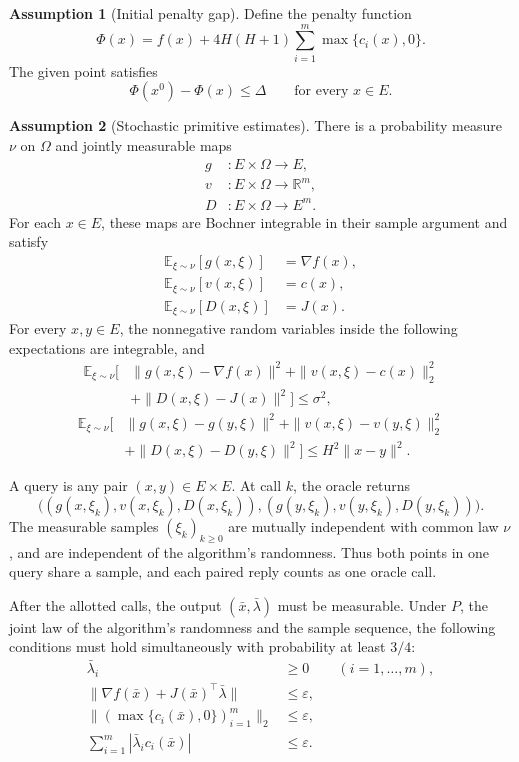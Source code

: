 \documentclass[10pt]{article}
\theoremstyle{definition}
\newtheorem{assumption}{Assumption}
\begin{document}
\begin{assumption}[Initial penalty gap]
Define the penalty function
\[
\Phi(x)=f(x)+4H(H+1)\sum_{i=1}^m\max\{c_i(x),0\}.
\]
The given point satisfies
\[
\Phi(x^0)-\Phi(x)\leq\Delta
\qquad\text{for every }x\in E.
\]
\end{assumption}

\begin{assumption}[Stochastic primitive estimates]
There is a probability measure $\nu$ on $\Omega$ and jointly measurable maps
\[
\begin{aligned}
g&:E\times\Omega\to E,\\
v&:E\times\Omega\to\mathbb{R}^m,\\
D&:E\times\Omega\to E^m.
\end{aligned}
\]
For each $x\in E$, these maps are Bochner integrable in their sample argument and satisfy
\[
\begin{aligned}
\mathbb{E}_{\xi\sim\nu}[g(x,\xi)]&=\nabla f(x),\\
\mathbb{E}_{\xi\sim\nu}[v(x,\xi)]&=c(x),\\
\mathbb{E}_{\xi\sim\nu}[D(x,\xi)]&=J(x).
\end{aligned}
\]
For every $x,y\in E$, the nonnegative random variables inside the following expectations are integrable, and
\[
\begin{aligned}
\mathbb{E}_{\xi\sim\nu}\bigl[
&\|g(x,\xi)-\nabla f(x)\|^2
+\|v(x,\xi)-c(x)\|_2^2\\
&+\|D(x,\xi)-J(x)\|^2\bigr]
\leq\sigma^2,
\end{aligned}
\]
\[
\begin{aligned}
\mathbb{E}_{\xi\sim\nu}\bigl[
&\|g(x,\xi)-g(y,\xi)\|^2
+\|v(x,\xi)-v(y,\xi)\|_2^2\\
&+\|D(x,\xi)-D(y,\xi)\|^2\bigr]
\leq H^2\|x-y\|^2.
\end{aligned}
\]
\end{assumption}

A query is any pair $(x,y)\in E\times E$. At call $k$, the oracle returns
\[
\bigl((g(x,\xi_k),v(x,\xi_k),D(x,\xi_k)),
      (g(y,\xi_k),v(y,\xi_k),D(y,\xi_k))\bigr).
\]
The measurable samples $(\xi_k)_{k\geq0}$ are mutually independent with common law $\nu$, and are independent of the algorithm's randomness. Thus both points in one query share a sample, and each paired reply counts as one oracle call.

After the allotted calls, the output $(\bar{x},\bar{\lambda})$ must be measurable. Under $P$, the joint law of the algorithm's randomness and the sample sequence, the following conditions must hold simultaneously with probability at least $3/4$:
\[
\begin{aligned}
\bar{\lambda}_i&\geq0 &&(i=1,\ldots,m),\\
\|\nabla f(\bar{x})+J(\bar{x})^\top\bar{\lambda}\|&\leq\varepsilon,\\
\bigl\|(\max\{c_i(\bar{x}),0\})_{i=1}^m\bigr\|_2&\leq\varepsilon,\\
\sum_{i=1}^m|\bar{\lambda}_i c_i(\bar{x})|&\leq\varepsilon.
\end{aligned}
\]
\end{document}
